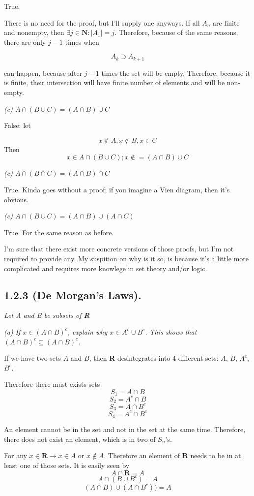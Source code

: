 \documentclass[11pt,oneside,titlepage]{book}
\begin{document}
True.

There is no need for the proof, but I'll supply one anyways. If all $A_n$ are
finite and nonempty, then $\exists j \in \textbf{N} : |A_1| = j$. Therefore,
because of the same reasons, there are only $j - 1$ times when

$$A_k \supset A_{k + 1}$$

can happen, because after $j - 1$ times the set will be empty. Therefore,
because it is finite, their intersection will have finite number of
elements and will be non-empty.

\textit{(c) $A \cap (B \cup C) = (A \cap B) \cup C$}

False: let

$$x \notin A, x \notin B, x \in C$$
Then
$$x \in A \cap (B \cup C); x \notin = (A \cap B) \cup C$$

\textit{(c) $A \cap (B \cap C) = (A \cap B) \cap C$}

True. Kinda goes without a proof; if you imagine a Vien diagram, then it's
obvious.

\textit{(c) $A \cap (B \cup C) = (A \cap B)  \cup (A \cap C)$}

True. For the same reason as before.

I'm sure that there exist more concrete versions of those proofs, but I'm not
required to provide any. My suspition on why is it so, is because it's a
little more complicated and requires more knowlege in set theory and/or logic.

\subsection*{1.2.3 (De Morgan's Laws).}

\textit{Let A and B be subsets of \textbf{R}}

\textit{(a) If $x \in (A \cap B)^c$, explain why $x \in A^c \cup B^c$. This
  shows that $(A \cap B)^c \subseteq (A \cap B)^c$.}

If we have two sets $A$ and $B$, then \textbf{R} desintegrates into 4 different
sets: $A$, $B$, $A^c$, $B^c$.

Therefore there must exists sets
$$S_1 = A \cap B$$
$$S_2 = A^c \cap B$$
$$S_3 = A \cap B^c$$
$$S_4 = A^c \cap B^c$$

An element cannot be in the set and not in the set at the same time. Therefore,
there does not exist an element, which is in two of $S_n$'s.

For any $x \in \textbf{R} \to x \in A$ or $x \notin A$. Therefore an element
of $\textbf{R}$ needs to be in at least one of those sets. It is easily seen by
$$A \cap \textbf{R} = A$$
$$A \cap (B \cup B^c) = A$$
$$(A \cap B) \cup (A \cap B^c)) = A$$
\end{document}
